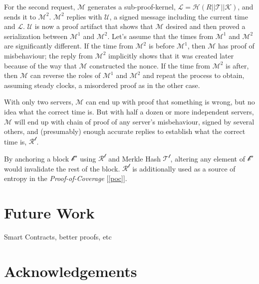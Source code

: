 \documentclass[letterpaper,11pt]{article}
\begin{document}
For the second request, $\mathcal{M}$ generates a sub-proof-kernel, $\mathcal{L} = \mathcal{H}(R || \mathcal{T} || \mathcal{K})$, and sends it to $\mathcal{M^2}$. $\mathcal{M^2}$ replies with $\mathcal{U}$, a signed message including the current time and $\mathcal{L}$. $\mathcal{U}$ is now a proof artifact that shows that $\mathcal{M}$ desired and then proved a serialization between $\mathcal{M^1}$ and $\mathcal{M^2}$. Let's assume that the times from $\mathcal{M^1}$ and $\mathcal{M^2}$ are significantly different. If the time from $\mathcal{M^2}$ is before $\mathcal{M^1}$, then $\mathcal{M}$ has proof of misbehaviour; the reply from $\mathcal{M^2}$ implicitly shows that it was created later because of the way that $\mathcal{M}$ constructed the nonce. If the time from $\mathcal{M^2}$ is after, then $\mathcal{M}$ can reverse the roles of $\mathcal{M^1}$ and $\mathcal{M^2}$ and repeat the process to obtain, assuming steady clocks, a misordered proof as in the other case.\newline  

With only two servers, $\mathcal{M}$ can end up with proof that something is wrong, but no idea what the correct time is. But with half a dozen or more independent servers, $\mathcal{M}$ will end up with chain of proof of any server's misbehaviour, signed by several others, and (presumably) enough accurate replies to establish what the correct time is, $\mathcal{R^t}$.\newline

By anchoring a block $\mathcal{b^n}$ using $\mathcal{R^t}$ and Merkle Hash $\mathcal{T^t}$, altering any element of $\mathcal{b^n}$ would invalidate the rest of the block. $\mathcal{R^t}$ is additionally used as a source of entropy in the \textit{Proof-of-Coverage} [\ref{poc}]. 

\section{Future Work}

Smart Contracts, better proofs, etc

\newpage

\section{Acknowledgements}
\end{document}
